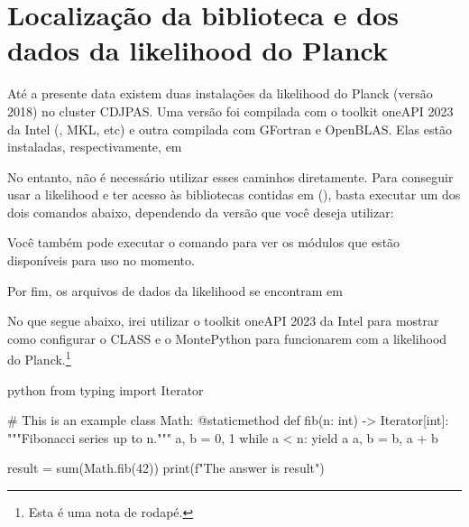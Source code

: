 \section{Localização da biblioteca e dos dados da likelihood do Planck}
\label{sec:planck}

Até a presente data existem duas instalações da likelihood do Planck (versão 2018) no cluster CDJPAS. Uma versão foi compilada com o toolkit oneAPI 2023 da Intel (, MKL, etc) e outra compilada com GFortran e OpenBLAS. Elas estão instaladas, respectivamente, em


\sloppypar
No entanto, não é necessário utilizar esses caminhos diretamente.
Para conseguir usar a likelihood e ter acesso às bibliotecas contidas em  (), basta executar um dos dois comandos abaixo, dependendo da versão que você deseja utilizar:


Você também pode executar o comando  para ver os módulos que estão disponíveis para uso no momento.

Por fim, os arquivos de dados da likelihood se encontram em


No que segue abaixo, irei utilizar o toolkit oneAPI 2023 da Intel para mostrar como configurar o CLASS e o MontePython para funcionarem com a likelihood do Planck.\footnote{Esta é uma nota de rodapé.}

\begin{code}[highlightlines=8-10]{python}
    from typing import Iterator

    # This is an example
    class Math:
        @staticmethod
        def fib(n: int) -> Iterator[int]:
            """Fibonacci series up to n."""
            a, b = 0, 1
            while a < n:
                yield a
                a, b = b, a + b

    result = sum(Math.fib(42))
    print(f"The answer is {result}")
\end{code}

